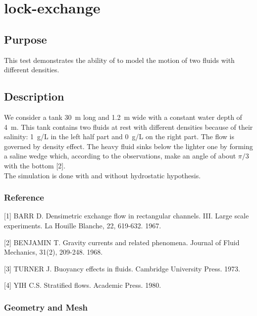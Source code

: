\chapter{lock-exchange}
%
%
\section{Purpose}
%
This test demonstrates the ability of  to model the motion
of two fluids with different densities.
%
\section{Description}
%
We consider a tank 30~m long and 1.2~m wide with a constant water depth
of 4~m.
This tank contains two fluids at rest with different densities because
of their salinity:
1~g/L in the left half part and 0~g/L on the right part.
The flow is governed by density effect.
The heavy fluid sinks below the lighter one by forming a saline wedge
which, according to the observations, make an angle of about $\pi/3$
with the bottom [2].\\
The simulation is done with and without hydrostatic hypothesis.
%
%
%
%
\subsection{Reference}
%
[1] BARR D. Densimetric exchange flow in rectangular channels.
III. Large scale experiments. La Houille Blanche, 22, 619-632. 1967.

[2] BENJAMIN T. Gravity currents and related phenomena.
Journal of Fluid Mechanics, 31(2), 209-248. 1968.

[3] TURNER J. Buoyancy effects in fluids. Cambridge University Press.
1973.

[4] YIH C.S. Stratified flows. Academic Press. 1980.
%
%
%
\subsection{Geometry and Mesh}
%
